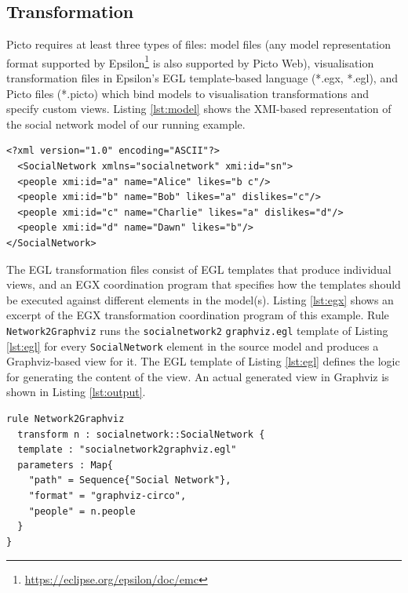 \documentclass[sigconf,review]{acmart}
\begin{document}
\subsection{Transformation}
\label{sec:transformation}

Picto requires at least three types of files: model files (any model representation format supported by Epsilon\footnote{\url{https://eclipse.org/epsilon/doc/emc}} is also supported by Picto Web), visualisation transformation files in Epsilon's EGL template-based language (*.egx, *.egl), and Picto files (*.picto) which bind models to visualisation transformations and specify custom views. Listing \ref{lst:model} shows the XMI-based representation of the social network model of our running example. 

\begin{lstlisting}[firstnumber=1,style=model,caption={An a social network model as the input file for the lazy transformation. The format of the ids is simplified.},label=lst:model]
<?xml version="1.0" encoding="ASCII"?>
  <SocialNetwork xmlns="socialnetwork" xmi:id="sn">
  <people xmi:id="a" name="Alice" likes="b c"/>
  <people xmi:id="b" name="Bob" likes="a" dislikes="c"/>
  <people xmi:id="c" name="Charlie" likes="a" dislikes="d"/>
  <people xmi:id="d" name="Dawn" likes="b"/>
</SocialNetwork>
\end{lstlisting}

The EGL transformation files consist of EGL templates that produce individual views, and an EGX coordination program that specifies how the templates should be executed against different elements in the model(s). Listing \ref{lst:egx} shows an excerpt of the EGX transformation coordination program of this example. Rule \texttt{Network2Graphviz} runs the \texttt{socialnetwork2} \texttt{graphviz.egl} template of Listing \ref{lst:egl} for every \texttt{SocialNetwork} element in the source model and produces a Graphviz-based view for it. The EGL template of Listing \ref{lst:egl} defines the logic for generating the content of the view. An actual generated view in Graphviz is shown in Listing \ref{lst:output}. 

\begin{lstlisting}[firstnumber=1,style=egx,caption={The Network2Graphviz EGX rule},label=lst:egx]
rule Network2Graphviz 
  transform n : socialnetwork::SocialNetwork {
  template : "socialnetwork2graphviz.egl"
  parameters : Map{
    "path" = Sequence{"Social Network"},
    "format" = "graphviz-circo",
    "people" = n.people
  }
}
\end{lstlisting}
\end{document}
